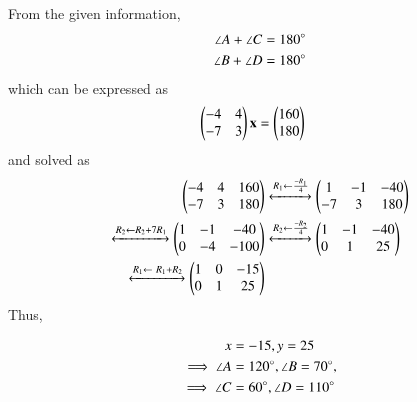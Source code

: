 From the given information, 
\begin{align}
\angle A + \angle C &=  180\degree\\
\angle B + \angle D &=  180\degree
\end{align}
%
which can be expressed as
\begin{align}
\begin{pmatrix}
-4 & 4 \\
-7 & 3 
\end{pmatrix}\mathbf{x} &= \begin{pmatrix}160\\180\end{pmatrix}
\end{align}
and solved as
\begin{align}
\begin{pmatrix}-4 & 4 & 160 \\
-7 & 3 & 180\end{pmatrix}
&\xleftrightarrow[]{R_1 \leftarrow \frac{-R_1}{4}}
\begin{pmatrix}1 & -1 & -40 \\
-7 & 3 & 180\end{pmatrix} \\
\xleftrightarrow[]{R_2 \leftarrow R_2 + 7R_1}
\begin{pmatrix}1 & -1 & -40 \\
0 & -4 & -100\end{pmatrix} 
&\xleftrightarrow[]{R_2 \leftarrow \frac{-R_2}{4}}
\begin{pmatrix}1 & -1 & -40 \\
0 & 1 & 25\end{pmatrix} \\
\xleftrightarrow[]{R_1 \leftarrow \ R_1+R_2}
\begin{pmatrix}1 & 0 & -15 \\
0 & 1 & 25\end{pmatrix} &
\end{align}
Thus, 

\begin{align}
x &= -15, 
y = 25 \\
\implies \angle A &= 120\degree ,
\angle B = 70\degree, \\
\implies \angle C &= 60\degree,  
\angle D = 110\degree 
\end{align}

%
%
%
%
